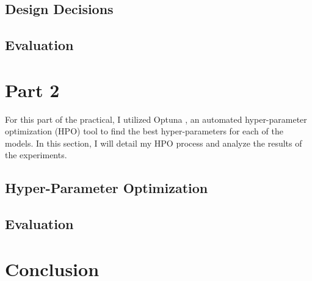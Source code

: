 \documentclass{article}
\begin{document}
\subsection{Design Decisions}

\subsection{Evaluation}

\section{Part 2}
For this part of the practical, I utilized Optuna \cite{optuna_2019}, an automated hyper-parameter optimization (HPO) tool to find the best hyper-parameters for each of the models. In this section, I will detail my HPO process and analyze the results of the experiments.

\subsection{Hyper-Parameter Optimization}

\subsection{Evaluation}

\section{Conclusion}

\printbibliography
\end{document}
